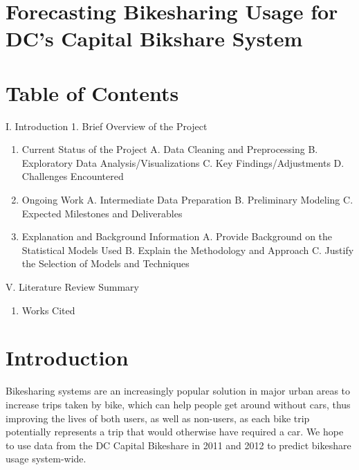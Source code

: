\documentclass[
  11pt,
]{article}
\author{}
\date{\vspace{-2.5em}}
\providecommand{\tightlist}{%
  \setlength{\itemsep}{0pt}\setlength{\parskip}{0pt}}
\begin{document}
\hypertarget{forecasting-bikesharing-usage-for-dcs-capital-bikshare-system}{%
\section{Forecasting Bikesharing Usage for DC's Capital Bikshare
System}\label{forecasting-bikesharing-usage-for-dcs-capital-bikshare-system}}

\hypertarget{table-of-contents}{%
\section{Table of Contents}\label{table-of-contents}}

I. Introduction 1. Brief Overview of the Project

\begin{enumerate}
\def\labelenumi{\Roman{enumi}.}
\setcounter{enumi}{1}
\item
  Current Status of the Project A. Data Cleaning and Preprocessing B.
  Exploratory Data Analysis/Visualizations C. Key Findings/Adjustments
  D. Challenges Encountered
\item
  Ongoing Work A. Intermediate Data Preparation B. Preliminary Modeling
  C. Expected Milestones and Deliverables
\item
  Explanation and Background Information A. Provide Background on the
  Statistical Models Used B. Explain the Methodology and Approach C.
  Justify the Selection of Models and Techniques
\end{enumerate}

V. Literature Review Summary

\begin{enumerate}
\def\labelenumi{\Roman{enumi}.}
\setcounter{enumi}{5}
\tightlist
\item
  Works Cited
\end{enumerate}

\hypertarget{introduction}{%
\section{Introduction}\label{introduction}}

Bikesharing systems are an increasingly popular solution in major urban
areas to increase trips taken by bike, which can help people get around
without cars, thus improving the lives of both users, as well as
non-users, as each bike trip potentially represents a trip that would
otherwise have required a car. We hope to use data from the DC Capital
Bikeshare in 2011 and 2012 to predict bikeshare usage system-wide.
\end{document}
